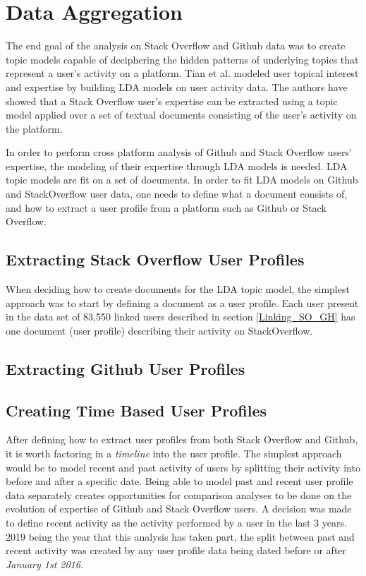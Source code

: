 \section{Data Aggregation} 
    The end goal of the analysis on Stack Overflow and Github data was to create topic models capable of deciphering the hidden patterns of underlying topics that represent a user's activity on a platform. Tian et al. \cite{tian2013predicting} modeled user topical interest and expertise by building LDA models on user activity data. The authors have showed that a Stack Overflow user's expertise can be extracted using a topic model applied over a set of textual documents consisting of the user's activity on the platform. 

    In order to perform cross platform analysis of Github and Stack Overflow users' expertise, the modeling of their expertise through LDA models is needed. LDA topic models are fit on a set of documents. In order to fit LDA models on Github and StackOverflow user data, one needs to define what a document consists of, and how to extract a user profile from a platform such as Github or Stack Overflow.  
    
    \subsection{Extracting Stack Overflow User Profiles}
        When deciding how to create documents for the LDA topic model, the simplest approach was to start by defining a document as a user profile. Each user present in the data set of 83,550 linked users described in section \ref{Linking_SO_GH} has one document (user profile) describing their activity on StackOverflow.
    
    \subsection{Extracting Github User Profiles}
    
    \subsection{Creating Time Based User Profiles}
    After defining how to extract user profiles from both Stack Overflow and Github, it is worth factoring in a \textit{timeline} into the user profile. The simplest approach would be to model recent and past activity of users by splitting their activity into before and after a specific date. Being able to model past and recent user profile data separately creates opportunities for comparison analyses to be done on the evolution of expertise of Github and Stack Overflow users. A decision was made to define recent activity as the activity performed by a user in the last 3 years. 2019 being the year that this analysis has taken part, the split between past and recent activity was created by any user profile data being dated before or after \textit{January 1st 2016}.

